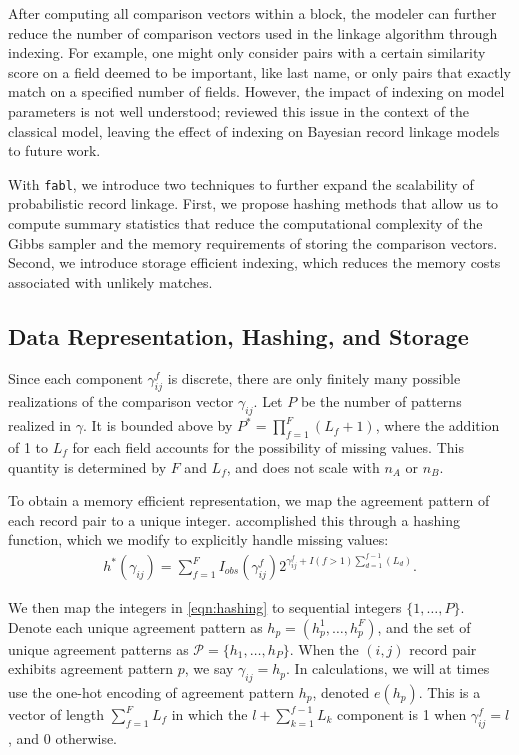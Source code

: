 \documentclass[ba]{imsart}
\begin{document}
After computing all comparison vectors within a block, the modeler can further reduce the number of comparison vectors used in the linkage algorithm through indexing. For example, one might only consider pairs with a certain similarity score on a field deemed to be important, like last name, or only pairs that exactly match on a specified number of fields. However, the impact of indexing on model parameters is not well understood; \cite{murray2016probabilistic} reviewed this issue in the context of the classical \cite{fellegi_theory_1969} model, leaving the effect of indexing on Bayesian record linkage models to future work.

With \texttt{fabl}, we introduce two techniques to further expand the scalability of probabilistic record linkage. First, we propose hashing methods that allow us to compute summary statistics that reduce the computational complexity of the Gibbs sampler and the memory requirements of storing the comparison vectors. Second, we introduce storage efficient indexing, which reduces the memory costs associated with unlikely matches. 

\hypertarget{data-representation-hashing-and-storage}{%
	\subsection{Data Representation, Hashing, and
		Storage}\label{data-representation-hashing-and-storage}}
	
Since each component $\gamma_{ij}^f$ is discrete, there are only finitely many possible realizations of the comparison vector $\gamma_{ij}$. Let $P$ be the number of patterns realized in $\gamma$. It is bounded above by $P^{*} =  \prod_{f=1}^F (L_f + 1)$, where the addition of 1 to $L_f$ for each field accounts for the possibility of missing values. This quantity is determined by $F$ and $L_f$, and does not scale with $n_A$ or $n_B$. 

To obtain a memory efficient representation, we map the agreement pattern of each record pair to a unique integer. \cite{enamorado2019using} accomplished this through a hashing function, which we modify to explicitly handle missing values:
\begin{align}
	\label{eqn:hashing}
	h^{*}(\gamma_{ij}) = \sum_{f = 1}^F I_{obs}(\gamma_{ij}^f)2^{\gamma_{ij}^f + I(f>1)\sum_{d=1}^{f-1}(L_d)}.
\end{align}

We then map the integers in \eqref{eqn:hashing} to sequential integers $\{1, \ldots, P\}$. Denote each unique agreement pattern as $h_p = (h_p^1, \ldots, h_p^F)$, and the set of unique agreement patterns as $\mathcal{P} = \{h_1, \ldots, h_P\}$. When the $(i,j)$ record pair exhibits agreement pattern $p$, we say $\gamma_{ij} = h_p$. In calculations, we will at times use the one-hot encoding of agreement pattern $h_p$, denoted $e(h_p)$. This is a vector of length $\sum_{f=1}^F L_f$ in which the $l + \sum_{k=1}^{f-1} L_k$ component is 1 when $\gamma_{ij}^f = l$, and 0 otherwise. 
\end{document}
